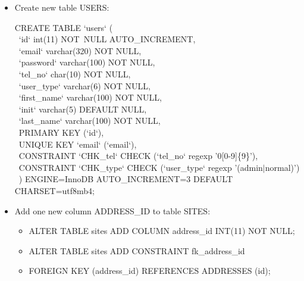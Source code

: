 \documentclass[titlepage]{article}
\begin{document}
\begin{itemize}

\item Create new table USERS: \vspace{1em}

\hspace{15pt}CREATE TABLE `users` ( \\
\-\ \hspace{30pt}`id` int(11) NOT\ NULL AUTO\_INCREMENT, \\
\-\ \hspace{30pt}`email` varchar(320) NOT NULL, \\
\-\ \hspace{30pt}`password` varchar(100) NOT NULL, \\
\-\ \hspace{30pt}`tel\_no` char(10) NOT NULL, \\
\-\ \hspace{30pt}`user\_type` varchar(6) NOT NULL, \\
\-\ \hspace{30pt}`first\_name` varchar(100) NOT NULL, \\
\-\ \hspace{30pt}`init` varchar(5) DEFAULT NULL, \\
\-\ \hspace{30pt}`last\_name` varchar(100) NOT NULL, \\
\-\ \hspace{30pt}PRIMARY KEY (`id`), \\
\-\ \hspace{30pt}UNIQUE KEY `email` (`email`), \\
\-\ \hspace{30pt}CONSTRAINT `CHK\_tel` CHECK (`tel\_no` regexp '0[0-9]\{9\}'), \\
\-\ \hspace{30pt}CONSTRAINT `CHK\_type` CHECK (`user\_type` regexp '(admin$\vert$normal)') \\
\-\ \hspace{15pt}) ENGINE=InnoDB AUTO\_INCREMENT=3 DEFAULT CHARSET=utf8mb4;

\vspace{1em}

\item Add one new column ADDRESS\_ID to table SITES: \vspace{1em}

\begin{itemize}
  \item ALTER TABLE sites ADD COLUMN address\_id INT(11) NOT NULL;
  \item ALTER TABLE sites ADD CONSTRAINT fk\_address\_id
  \item FOREIGN KEY (address\_id) REFERENCES ADDRESSES (id);
\end{itemize}


\end{itemize}
\end{document}
